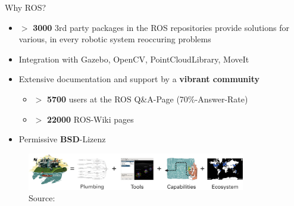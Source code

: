 \documentclass{beamer}
\begin{document}
\begin{frame}{Why ROS?}
 \begin{itemize}
 \item $>$ \textbf{3000} 3rd party packages in the ROS repositories provide solutions for various, in every robotic system reoccuring problems
 \item Integration with Gazebo, OpenCV, PointCloudLibrary, MoveIt
 \item Extensive documentation and support by a \textbf{vibrant community}
 \begin{itemize}
  \item $>$ \textbf{5700} users at the ROS Q\&{}A-Page (70\%-Answer-Rate)
  \item $>$ \textbf{22000} ROS-Wiki pages
 \end{itemize}
 \item Permissive \textbf{BSD}-Lizenz
 \end{itemize}
 \begin{figure}[H]
  \centering
  \includegraphics[width=0.85\textwidth]{ros-equation.png}
  \caption{Source: \cite{ROS:2015:Online}}
  \label{fig:ros_equation}
 \end{figure}
\end{frame}
\end{document}
